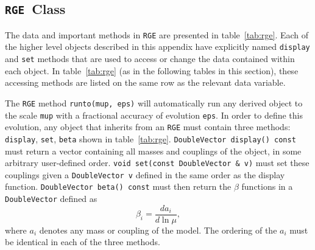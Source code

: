 \documentclass[]{article}
\def\code#1{\small{\tt #1}\normalsize}
\begin{document}
\subsection{\code{RGE}~Class}

The data and important methods in \code{RGE} are presented in
table~\ref{tab:rge}. 
Each of the higher level objects described in this appendix have explicitly
named \code{display} 
and \code{set} methods that are used to access or change the data contained
within each object. In table~\ref{tab:rge} (as in the following tables in
this section), these accessing methods are listed on the same row as the
relevant data variable. 

The \code{RGE} method \code{runto(mup, eps)} will automatically run any
derived object to the scale \code{mup} with a fractional accuracy of evolution
\code{eps}. In order to define this evolution, any object that inherits from an
{\tt RGE} must contain three methods: 
\code{display},
\code{set}, \code{beta} shown in table~\ref{tab:rge}. 
\code{DoubleVector display() const}
must return a vector containing all masses and couplings of the object, in some
arbitrary user-defined order. 
\code{void set(const DoubleVector \& v)} must set
these couplings given a 
\code{DoubleVector v} defined in the same order as the display function.
\code{DoubleVector beta() const} must then return the $\beta$ functions in a
\code{DoubleVector}  
defined as
\begin{equation}
\beta_i = \frac{d a_i}{d \ln \mu},
\end{equation}
where $a_i$ denotes any mass or coupling of the model. The ordering of the
$a_i$ must be identical in each of the three methods.
\end{document}
